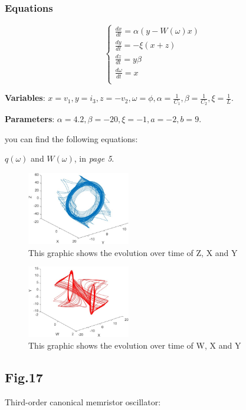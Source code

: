 \documentclass[12pt, a4paper]{paper}
\begin{document}
\subsubsection{Equations}
\begin{equation}
\begin{cases}
\frac{dx}{dt}=\alpha(y-W(\omega)x)
\\
\frac{dy}{dt}=-\xi(x+z)
\\
\frac{dz}{dt}=y\beta
\\
\frac{d\omega}{dt}=x
\\
\end{cases}
\end{equation}

\textbf{Variables}: $x=v_1, y=i_3, z=-v_2, \omega=\phi, \alpha=\frac{1}{C_1},
\beta=\frac{1}{C_2}, \xi=\frac{1}{L}$.

\textbf{Parameters}: $\alpha =4.2, \beta =-20, \xi =-1, a=-2, b=9$.

you can find the following equations:

$q(\omega)$ and $W(\omega)$, in \textit{page 5}.

\begin{figure}[h]
\centering
\includegraphics[width=0.4\textwidth]{Fig_12_1.eps}
\caption{This graphic shows the evolution over time of Z, X and Y}
\end{figure}

\begin{figure}[h]
\centering
\includegraphics[width=0.4\textwidth]{Fig_12_2.eps}
\caption{This graphic shows the evolution over time of W, X and Y}
\end{figure}


\newpage
\subsection{Fig.17}
Third-order canonical memristor oscillator:
\end{document}
